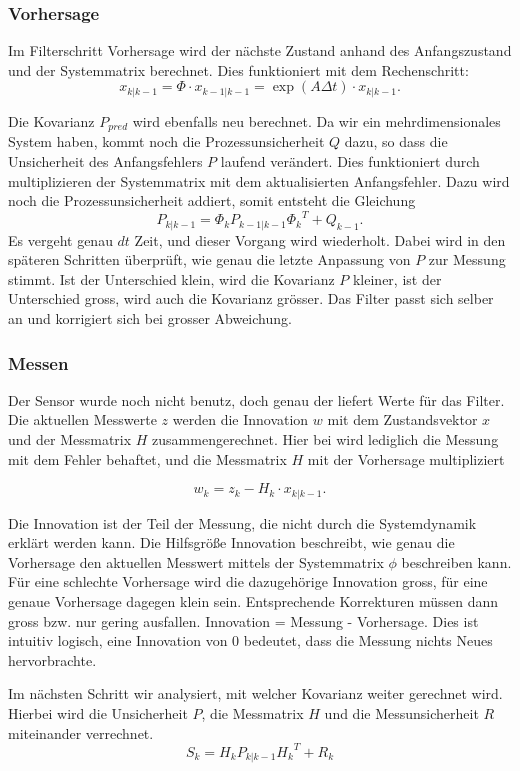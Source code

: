 \subsubsection*{Vorhersage}
Im Filterschritt Vorhersage wird der nächste Zustand anhand des Anfangszustand und der Systemmatrix berechnet. 
Dies funktioniert mit dem Rechenschritt:
\[ 
{x_{k|k-1}}=\Phi \cdot {x_{k-1|k-1}}= \exp(A\Delta t)\cdot{x_{k|k-1}}.
 \] 

Die Kovarianz $P_{pred}$ wird ebenfalls neu berechnet. Da wir ein mehrdimensionales System haben, kommt noch die Prozessunsicherheit $Q$ dazu, so dass die Unsicherheit des Anfangsfehlers $P$ laufend verändert. 
Dies funktioniert durch multiplizieren der Systemmatrix mit dem aktualisierten Anfangsfehler. 
Dazu wird noch die Prozessunsicherheit addiert, somit entsteht die Gleichung
\[ {P_{k|k-1}} = {\Phi_k}  {P_{k-1|k-1}} {\Phi_k} ^T + {Q_{k-1}} .\] 
Es vergeht genau $dt$ Zeit, und dieser Vorgang wird wiederholt. 
Dabei wird in den späteren Schritten überprüft, wie genau die letzte Anpassung von $P$ zur Messung stimmt. 
Ist der Unterschied klein, wird die Kovarianz $P$ kleiner, ist der Unterschied gross, wird auch die Kovarianz grösser. 
Das Filter passt sich selber an und korrigiert sich bei grosser Abweichung.

\subsubsection*{Messen}
Der Sensor wurde noch nicht benutz, doch genau der liefert Werte für das Filter. 
Die aktuellen Messwerte $z$ werden die Innovation $w$ mit dem Zustandsvektor $x$ und der Messmatrix $H$ zusammengerechnet.
Hier bei wird lediglich die Messung mit dem Fehler behaftet, und die Messmatrix $H$ mit der Vorhersage multipliziert

\[{w_{k}}={z_{k}}-{H_{k}}\cdot{x_{k|k-1}}.\] 

Die Innovation ist der Teil der Messung, die nicht durch die Systemdynamik erklärt werden kann. 
Die Hilfsgröße Innovation beschreibt, wie genau die Vorhersage den aktuellen Messwert mittels der Systemmatrix $\phi$ beschreiben kann. 
Für eine schlechte Vorhersage wird die dazugehörige Innovation gross, für eine genaue Vorhersage dagegen klein sein. 
Entsprechende Korrekturen müssen dann gross bzw. nur gering ausfallen. 
Innovation = Messung - Vorhersage. Dies ist intuitiv logisch, eine Innovation von 0 bedeutet, dass die Messung nichts Neues hervorbrachte.

Im nächsten Schritt wir analysiert, mit welcher Kovarianz weiter gerechnet wird. 
Hierbei wird die Unsicherheit $P$, die Messmatrix $H$ und die Messunsicherheit $R$ miteinander verrechnet. 
\[ 
{S_{k}}={H_{k}}{P_{k|k-1}}{H_{k}}^T+{R_{k}}
 \] 

